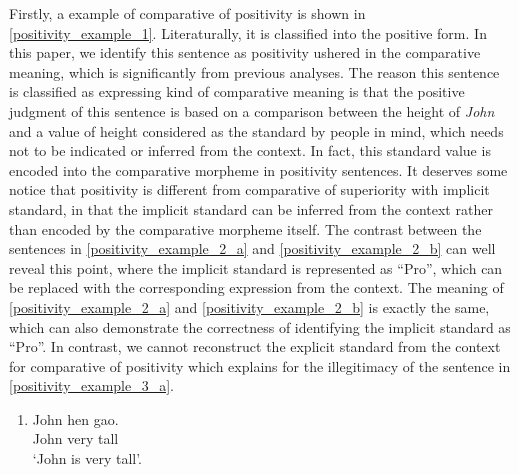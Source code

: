 \documentclass{ctexart}
\begin{document}
\noindent
Firstly, a example of comparative of positivity is shown in \ref{positivity_example_1}. Literaturally, it is classified into the positive form. In this paper, we identify this sentence as positivity ushered in the comparative meaning, which is significantly from previous analyses. The reason this sentence is classified as expressing kind of comparative meaning is that the positive judgment of this sentence is based on a comparison between the height of \textit{John} and a value of height considered as the standard by people in mind, which needs not to be indicated or inferred from the context. In fact, this standard value is encoded into the comparative morpheme in positivity sentences. It deserves some notice that positivity is different from comparative of superiority with implicit standard, in that the implicit standard can be inferred from the context rather than encoded by the comparative morpheme itself. The contrast between the sentences in \ref{positivity_example_2_a} and \ref{positivity_example_2_b} can well reveal this point, where the implicit standard is represented as ``Pro'', which can be replaced with the corresponding expression from the context. The meaning of \ref{positivity_example_2_a} and \ref{positivity_example_2_b} is exactly the same, which can also demonstrate the correctness of identifying the implicit standard as ``Pro''. In contrast, we cannot reconstruct the explicit standard from the context for comparative of positivity which explains for the illegitimacy of the sentence in \ref{positivity_example_3_a}.

\begin{enumerate}
    \item \label{positivity_example_1}
    John hen gao.  \\
    John very tall \\
    `John is very tall'.
\end{enumerate}
\end{document}

